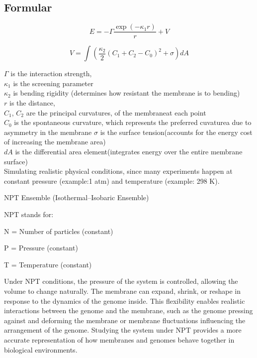 \documentclass[12pt]{article}
\begin{document}
\begin{flushleft}
\subsection*{Formular}


\begin{equation}
E = -\Gamma \frac{\exp(-\kappa_1 r)}{r} +V
\end{equation}


\begin{equation}
V= \int \left( \frac{\kappa_2}{2} (C_1 + C_2 - C_0)^2 + \sigma \right) dA
\end{equation}




\(\Gamma\) is the interaction strength,\\
\(\kappa_1\) is the screening parameter \\
\(\kappa_2\) is bending rigidity (determines how resistant the membrane is to bending) \\
\(r\) is the distance, \\
\(C_1\), \(C_2\) are the principal curvatures, of the membraneat each point\\
\(C_0\) is the spontaneous curvature, which represents the preferred cuvaturea due to asymmetry in the membrane
\(\sigma\) is the surface tension(accounts for the energy cost of increasing the membrane area)\\
\(dA\) is the differential area element(integrates energy over the entire membrane surface)\\



Simulating realistic physical conditions, since many experiments happen at constant pressure (example:1 atm) and temperature  (example: 298 K).

\noindent NPT Ensemble (Isothermal–Isobaric Ensemble)

NPT stands for:

    N = Number of particles (constant)

    P = Pressure (constant)

    T = Temperature (constant)
    
    Under NPT conditions, the pressure of the system is controlled, allowing the volume to change naturally. The membrane can expand, shrink, or reshape in response to the dynamics of the genome inside. This flexibility enables realistic interactions between the genome and the membrane, such as the genome pressing against and deforming the membrane or membrane fluctuations influencing the arrangement of the genome. Studying the system under NPT provides a more accurate representation of how membranes and genomes behave together in biological environments.


\end{flushleft}
\end{document}
